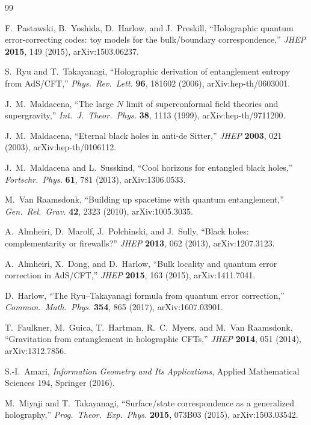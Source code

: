 \documentclass[12pt]{article}
\theoremstyle{definition}
\theoremstyle{remark}
\begin{document}
\begin{thebibliography}{99}

 F.~Pastawski, B.~Yoshida, D.~Harlow, and J.~Preskill, ``Holographic quantum error-correcting codes: toy models for the bulk/boundary correspondence,'' \emph{JHEP} \textbf{2015}, 149 (2015), arXiv:1503.06237.

 S.~Ryu and T.~Takayanagi, ``Holographic derivation of entanglement entropy from AdS/CFT,'' \emph{Phys.\ Rev.\ Lett.} \textbf{96}, 181602 (2006), arXiv:hep-th/0603001.

 J.~M.~Maldacena, ``The large $N$ limit of superconformal field theories and supergravity,'' \emph{Int.\ J.\ Theor.\ Phys.} \textbf{38}, 1113 (1999), arXiv:hep-th/9711200.

 J.~M.~Maldacena, ``Eternal black holes in anti-de Sitter,'' \emph{JHEP} \textbf{2003}, 021 (2003), arXiv:hep-th/0106112.

 J.~M.~Maldacena and L.~Susskind, ``Cool horizons for entangled black holes,'' \emph{Fortschr.\ Phys.} \textbf{61}, 781 (2013), arXiv:1306.0533.

 M.~Van Raamsdonk, ``Building up spacetime with quantum entanglement,'' \emph{Gen.\ Rel.\ Grav.} \textbf{42}, 2323 (2010), arXiv:1005.3035.

 A.~Almheiri, D.~Marolf, J.~Polchinski, and J.~Sully, ``Black holes: complementarity or firewalls?'' \emph{JHEP} \textbf{2013}, 062 (2013), arXiv:1207.3123.

 A.~Almheiri, X.~Dong, and D.~Harlow, ``Bulk locality and quantum error correction in AdS/CFT,'' \emph{JHEP} \textbf{2015}, 163 (2015), arXiv:1411.7041.

 D.~Harlow, ``The Ryu--Takayanagi formula from quantum error correction,'' \emph{Commun.\ Math.\ Phys.} \textbf{354}, 865 (2017), arXiv:1607.03901.

 T.~Faulkner, M.~Guica, T.~Hartman, R.~C.~Myers, and M.~Van Raamsdonk, ``Gravitation from entanglement in holographic CFTs,'' \emph{JHEP} \textbf{2014}, 051 (2014), arXiv:1312.7856.

 S.-I.~Amari, \emph{Information Geometry and Its Applications}, Applied Mathematical Sciences 194, Springer (2016).

 M.~Miyaji and T.~Takayanagi, ``Surface/state correspondence as a generalized holography,'' \emph{Prog.\ Theor.\ Exp.\ Phys.} \textbf{2015}, 073B03 (2015), arXiv:1503.03542.


\end{thebibliography}
\end{document}
